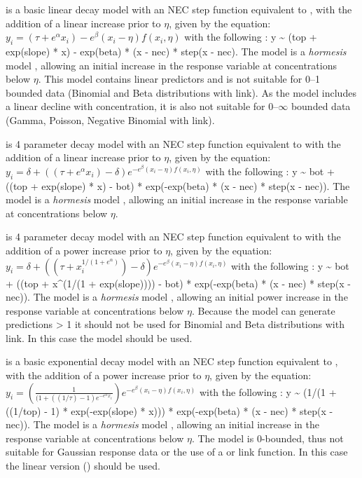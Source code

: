 \documentclass[
  shortnames]{jss}
\begin{document}
 is a basic linear decay model with an NEC step function equivalent to , with the addition of a linear increase prior to \(\eta\), given by the equation:
\(y_i = (\tau + e^{\alpha} x_i) - e^{\beta} \left(x_i - \eta \right) f(x_i, \eta)\)
with the following : y \textasciitilde{} (top + exp(slope) * x) - exp(beta) * (x - nec) * step(x - nec). The  model is a \emph{hormesis} model \citep{Mattson2008}, allowing an initial increase in the response variable at concentrations below \(\eta\). This model contains linear predictors and is not suitable for 0--1 bounded data (Binomial and Beta distributions with  link). As the model includes a linear decline with concentration, it is also not suitable for 0--\(\infty\) bounded data (Gamma, Poisson, Negative Binomial with  link).

 is 4 parameter decay model with an NEC step function equivalent to  with the addition of a linear increase prior to \(\eta\), given by the equation:
\(y_i = \delta + ((\tau + e^{\alpha} x_i) - \delta ) e^{-e^{\beta} \left(x_i - \eta \right) f(x_i, \eta)}\)
with the following : y \textasciitilde{} bot + ((top + exp(slope) * x) - bot) * exp(-exp(beta) * (x - nec) * step(x - nec)). The  model is a \emph{hormesis} model \citep{Mattson2008}, allowing an initial increase in the response variable at concentrations below \(\eta\).

 is 4 parameter decay model with an NEC step function equivalent to  with the addition of a power increase prior to \(\eta\), given by the equation:
\(y_i = \delta + ((\tau + x_i^{1/(1+e^{\alpha})}) - \delta) e^{-e^{\beta} \left(x_i - \eta \right) f(x_i, \eta)}\)
with the following : y \textasciitilde{} bot + ((top + x\^{}(1/(1 + exp(slope)))) - bot) * exp(-exp(beta) * (x - nec) * step(x - nec)). The  model is a \emph{hormesis} model \citep{Mattson2008}, allowing an initial power increase in the response variable at concentrations below \(\eta\). Because the model can generate predictions \textgreater{} 1 it should not be used for Binomial and Beta distributions with  link. In this case the  model should be used.

 is a basic exponential decay model with an NEC step function equivalent to , with the addition of a power increase prior to \(\eta\), given by the equation:
\(y_i = \left(\frac{1}{(1 + ((1/\tau)-1) e^{-e^{\alpha}x_i}}\right) e^{-e^{\beta} \left(x_i - \eta \right) f(x_i, \eta)}\)
with the following : y \textasciitilde{} (1/(1 + ((1/top) - 1) * exp(-exp(slope) * x))) * exp(-exp(beta) * (x - nec) * step(x - nec)). The  model is a \emph{hormesis} model \citep{Mattson2008}, allowing an initial increase in the response variable at concentrations below \(\eta\). The model is 0-bounded, thus not suitable for Gaussian response data or the use of a  or  link function. In this case the linear version () should be used.
\end{document}

